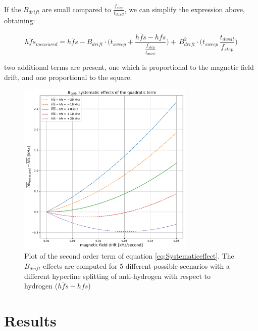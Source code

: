 \documentclass[11pt,a4paper,oneside]{article}
\begin{document}
If the $B_{drift}$ are small compared to $\frac{f_{step}}{t_{dwell}}$, we can simplify the expression above, obtaining:

\begin{equation}
\overline{hfs}_{measured} = \overline{hfs} - B_{drift} \cdot \biggl(t_{sweep} + \frac{ \overline{hfs} - hfs}{\frac{f_{step}}{t_{dwell}}} \biggl) + \, B_{drift}^{2} \cdot \biggl( t_{sweep} \, \frac{t_{dwell}}{f_{step}} \biggl)
\end{equation}

two additional terms are present, one which is proportional to the magnetic field drift, and one proportional to the square.


\begin{figure}[hbtp]
\centering
\includegraphics[width = 0.75\textwidth]{SecondOrderTerm.pdf}
\caption{Plot of the second order term of equation \ref{eq:Systematiceffect}. The $B_{drift}$ effects are computed for 5 different possible scenarios with a different hyperfine splitting of anti-hydrogen with respect to hydrogen ($\overline{hfs} - hfs$) }
\end{figure}


\section{Results}
\end{document}
